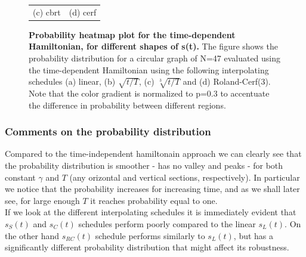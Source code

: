 \begin{figure}[ht]
\begin{tabular}{cc}
        (c) cbrt & (d) cerf\\[6pt]
        \end{tabular}
        \caption[Probability heatmap plot for the time-dependent Hamiltonian, for different shapes of s(t)]{\textbf{Probability heatmap plot for the time-dependent Hamiltonian, for different shapes of s(t).} The figure shows the probability distribution for a circular graph of N=47 evaluated using the time-dependent Hamiltonian using the following interpolating schedules (a) linear, (b) $\sqrt{t/T}$, (c) $\sqrt[3]{t/T}$ and (d) Roland-Cerf(3). Note that the color gradient is normalized to p=0.3 to accentuate the difference in probability between different regions. }
        \label{fig:heatmap-dependent}
        \end{figure}
        \subsubsection*{Comments on the probability distribution}
        Compared to the time-independent hamiltonain approach we can clearly see that the probability distribution is smoother - has no valley and peaks - for both constant $\gamma$ and $T$ (any orizontal and vertical sections, respectively). In particular we notice that the probability increases for increasing time, and as we shall later see, for large enough $T$ it reaches probability equal to one.\\ If we look at the different interpolating schedules it is immediately evident that $s_S(t)$ and $s_C(t)$ schedules perform poorly compared to the linear $s_L(t)$. On the other hand $s_{RC}(t)$ schedule performs similarly to $s_L(t)$, but has a significantly different probability distribution  that might affect its robustness.

